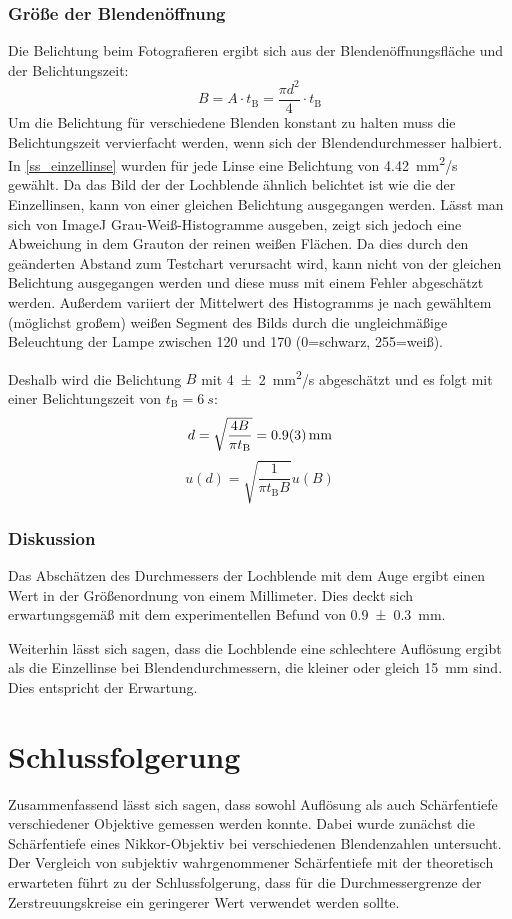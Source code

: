 \documentclass[
	a4paper,
	12pt,
	pagesize,
	ngerman
]{scrartcl}
\begin{document}
	\subsubsection*{Größe der Blendenöffnung}
	Die Belichtung beim Fotografieren ergibt sich aus der Blendenöffnungsfläche und der Belichtungszeit:
	\begin{equation}
		B = A \cdot t_\text{B} = \frac{\pi d^2}{4} \cdot t_\text{B}
	\end{equation}
	Um die Belichtung für verschiedene Blenden konstant zu halten muss die Belichtungszeit vervierfacht werden, wenn sich der Blendendurchmesser halbiert.
	In \cref{ss_einzellinse} wurden für jede Linse eine Belichtung von \SI{4,42}{mm^2/s} gewählt.
	Da das Bild der der Lochblende ähnlich belichtet ist wie die der Einzellinsen, kann von einer gleichen Belichtung ausgegangen werden.
	Lässt man sich von ImageJ Grau-Weiß-Histogramme ausgeben, zeigt sich jedoch eine Abweichung in dem Grauton der reinen weißen Flächen.
	Da dies durch den geänderten Abstand zum Testchart verursacht wird, kann nicht von der gleichen Belichtung ausgegangen werden und diese muss mit einem Fehler abgeschätzt werden.
	Außerdem variiert der Mittelwert des Histogramms je nach gewähltem (möglichst großem) weißen Segment des Bilds durch die ungleichmäßige Beleuchtung der Lampe zwischen 120 und 170 (0=schwarz, 255=weiß).

	Deshalb wird die Belichtung $B$ mit \SI{4+-2}{mm^2/s} abgeschätzt und es folgt mit einer Belichtungszeit von $t_\text{B}=\SI{6}{s}$:
	\begin{equation}
		d = \sqrt{\frac{4B}{\pi t_\text{B}}} = \SI{0,9+-0,3}{mm}
	\end{equation}
	\begin{equation}
		u(d) = \sqrt{\frac{1}{\pi t_\text{B}B}}u(B)
	\end{equation}

	
	\subsubsection{Diskussion}
		Das Abschätzen des Durchmessers der Lochblende mit dem Auge ergibt einen Wert in der Größenordnung von einem Millimeter.
		Dies deckt sich erwartungsgemäß mit dem experimentellen Befund von \SI{0,9\pm 0,3}{mm}.
		
		Weiterhin lässt sich sagen, dass die Lochblende eine schlechtere Auflösung ergibt als die Einzellinse bei Blendendurchmessern, die kleiner oder gleich \SI{15}{mm} sind.
		Dies entspricht der Erwartung.
	\section{Schlussfolgerung}
	Zusammenfassend lässt sich sagen, dass sowohl Auflösung als auch Schärfentiefe verschiedener Objektive gemessen werden konnte.
	Dabei wurde zunächst die Schärfentiefe eines Nikkor-Objektiv bei verschiedenen Blendenzahlen untersucht.
	Der Vergleich von subjektiv wahrgenommener Schärfentiefe mit der theoretisch erwarteten führt zu der Schlussfolgerung, dass für die Durchmessergrenze der Zerstreuungskreise ein geringerer Wert verwendet werden sollte.
	
\end{document}
